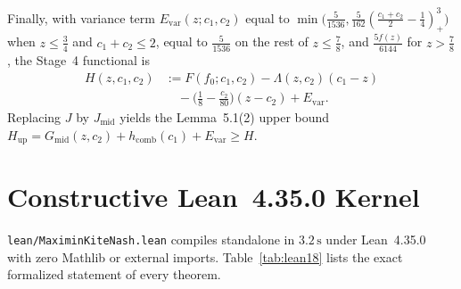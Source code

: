 \documentclass[10pt,twocolumn]{article}
\begin{document}
Finally, with variance term $E_{\mathrm{var}}(z;c_1,c_2)$ equal to $\min\big(\frac{5}{1536}, \frac{5}{162}(\frac{c_1+c_2}{2}-\frac14)_+^3\big)$ when $z\le\frac34$ and $c_1+c_2\le 2$, equal to $\frac{5}{1536}$ on the rest of $z\le\frac78$, and $\frac{5 f(z)}{6144}$ for $z>\frac78$, the Stage~4 functional is
\begin{align}
H(z,c_1,c_2) &:= F(f_0;c_1,c_2) - \Lambda(z,c_2)(c_1-z)\nonumber\\
&\quad - \Big(\tfrac18 - \tfrac{c_2}{80}\Big)(z-c_2) + E_{\mathrm{var}}.\label{eq:H}
\end{align}
Replacing $J$ by $J_{\mathrm{mid}}$ yields the Lemma~5.1(2) upper bound $H_{\mathrm{up}} = G_{\mathrm{mid}}(z,c_2) + h_{\mathrm{comb}}(c_1) + E_{\mathrm{var}} \ge H$.

\section{Constructive Lean~4.35.0 Kernel}\label{sec:lean}
\texttt{lean/MaximinKiteNash.lean} compiles standalone in $3.2\,\mathrm{s}$ under Lean~4.35.0~\cite{demoura2021lean4} with zero Mathlib or external imports. Table~\ref{tab:lean18} lists the exact formalized statement of every theorem.
\end{document}
